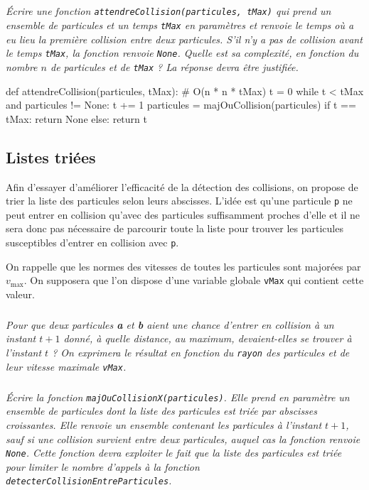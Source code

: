 \documentclass[10pt,fleqn]{article} %
\begin{document}
\subparagraph{}
\textit{Écrire une fonction \texttt{attendreCollision(particules, tMax)} qui prend un ensemble de particules et un temps \texttt{tMax} en paramètres et renvoie le temps où a eu lieu la première collision entre
deux particules. S'il n'y a pas de collision avant le temps \texttt{tMax}, la fonction renvoie \texttt{None}. Quelle
est sa complexité, en fonction du nombre $n$ de particules et de \texttt{tMax} ? La réponse devra être
justifiée.}
\ifprof
\begin{corrige}
\begin{python}
def attendreCollision(particules, tMax):
    # O(n * n * tMax)
    t = 0
    while t < tMax and particules != None:
        t += 1
        particules = majOuCollision(particules)
    if t == tMax:
        return None
    else:
        return t
\end{python}
\end{corrige}
\else
\fi


\subsection*{Listes triées}

Afin d'essayer d'améliorer l'efficacité de la détection des collisions, on propose de trier la liste des
particules selon leurs abscisses. L'idée est qu'une particule \texttt{p} ne peut entrer en collision qu'avec
des particules suffisamment proches d'elle et il ne sera donc pas nécessaire de parcourir toute
la liste pour trouver les particules susceptibles d'entrer en collision avec \texttt{p}.

On rappelle que les normes des vitesses de toutes les particules sont majorées par $v_{\text{max}}$. On
supposera que l'on dispose d'une variable globale \texttt{vMax} qui contient cette valeur.

\subparagraph{}
\textit{Pour que deux particules \textbf{a} et \textbf{b} aient une chance d'entrer en collision à un instant $t+1$ donné,
à quelle distance, au maximum, devaient-elles se trouver à l'instant $t$ ? On exprimera le résultat
en fonction du \texttt{rayon} des particules et de leur vitesse maximale \texttt{vMax}.}
\ifprof
\begin{corrige}
\begin{python}

\end{python}
\end{corrige}
\else
\fi


\subparagraph{}
\textit{Écrire la fonction \texttt{majOuCollisionX(particules)}. Elle prend en paramètre un ensemble de
particules dont la liste des particules est triée par abscisses croissantes. Elle renvoie un ensemble
contenant les particules à l'instant $t+1$, sauf si une collision survient entre deux particules, auquel
cas la fonction renvoie \texttt{None}. Cette fonction devra exploiter le fait que la liste des particules est
triée pour limiter le nombre d'appels à la fonction \texttt{detecterCollisionEntreParticules}.}
\ifprof
\begin{corrige}
\begin{python}

\end{python}
\end{corrige}
\else
\fi
\end{document}
